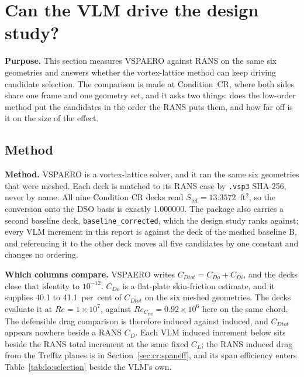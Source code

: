 \section{Can the VLM drive the design study?}
\label{sec:lo}
\label{sec:qv}
\textbf{Purpose.} This section measures VSPAERO against RANS on the same six geometries and
answers whether the vortex-lattice method can keep driving candidate selection. The comparison
is made at Condition~CR, where both sides share one frame and one geometry set, and it asks two
things: does the low-order method put the candidates in the order the RANS puts them, and how
far off is it on the size of the effect.

\subsection{Method}
\label{sec:qv:vlmmethod}
\textbf{Method.} VSPAERO is a vortex-lattice solver, and it ran the same six geometries that were
meshed. Each deck is matched to its RANS case by \texttt{.vsp3} SHA-256, never by name. All nine
Condition CR decks read $S_\mathrm{ref} = 13.3572$~ft$^2$, so the conversion onto the DSO basis is
exactly 1.000000. The package also carries a second baseline deck, \texttt{baseline\_corrected},
which the design study ranks against; every VLM increment in this report is against the deck of
the meshed baseline B, and referencing it to the other deck moves all five candidates by one
constant and changes no ordering.

\textbf{Which columns compare.} VSPAERO writes $C_{Dtot} = C_{Do} + C_{Di}$, and the decks close
that identity to $10^{-12}$. $C_{Do}$ is a flat-plate skin-friction estimate, and it supplies
40.1 to 41.1~per~cent of $C_{Dtot}$ on the six meshed geometries. The decks evaluate it at
$Re = 1\times10^{7}$, against $Re_{C_\mathrm{ref}} = 0.92\times10^{6}$ here on the same chord. The
defensible drag comparison is therefore induced against induced, and $C_{Dtot}$ appears nowhere
beside a RANS $C_D$. Each VLM induced increment below sits beside the RANS total increment at the
same fixed $C_L$; the RANS induced drag from the Trefftz planes is in Section~\ref{sec:cr:spaneff},
and its span efficiency enters Table~\ref{tab:lo:selection} beside the VLM's own.

